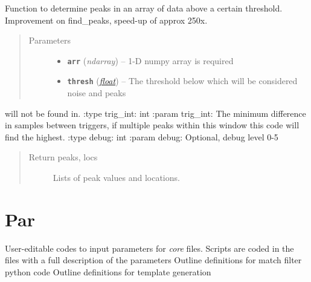 \documentclass[a4paper,10pt,english]{sphinxmanual}
\begin{document}
\begin{fulllineitems}
\label{modules:findpeaks.find_peaks2}
Function to determine peaks in an array of data above a certain threshold.
Improvement on find\_peaks, speed-up of approx 250x.
\begin{quote}\begin{description}
\item[{Parameters}] \leavevmode\begin{itemize}
\item {} 
\textbf{\texttt{arr}} (\emph{ndarray}) -- 1-D numpy array is required

\item {} 
\textbf{\texttt{thresh}} (\href{https://docs.python.org/library/functions.html\#float}{\emph{float}}) -- The threshold below which will be considered noise and peaks

\end{itemize}

\end{description}\end{quote}

will not be found in.
:type trig\_int: int
:param trig\_int: The minimum difference in samples between triggers,
if multiple peaks within this window this code will find the highest.
:type debug: int
:param debug: Optional, debug level 0-5
\begin{quote}\begin{description}
\item[{Return peaks, locs}] \leavevmode
Lists of peak values and locations.

\end{description}\end{quote}

\end{fulllineitems}



\chapter{Par}
\label{modules:par}
User-editable codes to input parameters for \emph{core} files.
Scripts are coded in the files with a full description of the parameters
\label{modules:module-match_filter_par}
Outline definitions for match filter python code
\label{modules:module-template_gen_par}
Outline definitions for template generation
\end{document}

